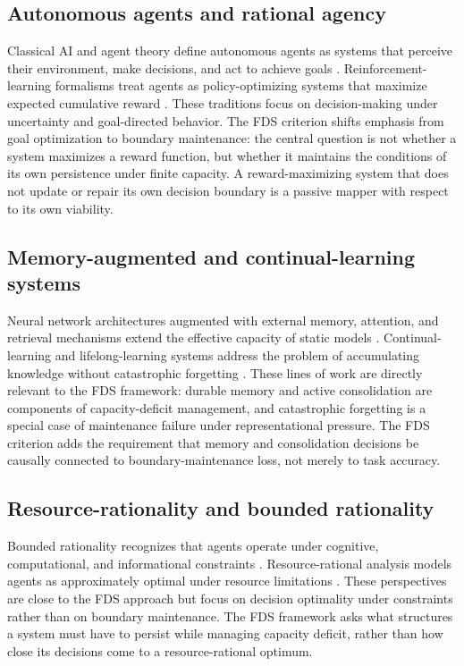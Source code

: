 \documentclass[10pt,a4paper,twocolumn,aps,prl]{revtex4-2}
\begin{document}
\subsection{Autonomous agents and rational agency}

Classical AI and agent theory define autonomous agents as systems that perceive their environment, make decisions, and act to achieve goals \cite{russell2020ai,russell2016artificial}. Reinforcement-learning formalisms treat agents as policy-optimizing systems that maximize expected cumulative reward \cite{sutton2018reinforcement}. These traditions focus on decision-making under uncertainty and goal-directed behavior. The FDS criterion shifts emphasis from goal optimization to boundary maintenance: the central question is not whether a system maximizes a reward function, but whether it maintains the conditions of its own persistence under finite capacity. A reward-maximizing system that does not update or repair its own decision boundary is a passive mapper with respect to its own viability.

\subsection{Memory-augmented and continual-learning systems}

Neural network architectures augmented with external memory, attention, and retrieval mechanisms extend the effective capacity of static models \cite{graves2014neural,vaswani2017attention,rae2016scaling}. Continual-learning and lifelong-learning systems address the problem of accumulating knowledge without catastrophic forgetting \cite{mccloskey1989catastrophic,kirkpatrick2017overcoming,parisi2019continual}. These lines of work are directly relevant to the FDS framework: durable memory and active consolidation are components of capacity-deficit management, and catastrophic forgetting is a special case of maintenance failure under representational pressure. The FDS criterion adds the requirement that memory and consolidation decisions be causally connected to boundary-maintenance loss, not merely to task accuracy.

\subsection{Resource-rationality and bounded rationality}

Bounded rationality recognizes that agents operate under cognitive, computational, and informational constraints \cite{simon1955behavioral,gigerenzer2002bounded}. Resource-rational analysis models agents as approximately optimal under resource limitations \cite{lieder2020resource,shenhav2017completion}. These perspectives are close to the FDS approach but focus on decision optimality under constraints rather than on boundary maintenance. The FDS framework asks what structures a system must have to persist while managing capacity deficit, rather than how close its decisions come to a resource-rational optimum.
\end{document}
